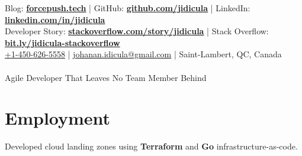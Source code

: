 \documentclass[]{jidicula-resume}
\begin{document}
\livelocation\hfill\lastupdated{}

{ Blog: \href{http://bit.ly/jidicula-site}{\bf forcepush.tech}
  | GitHub: \href{http://bit.ly/jidicula_github}{\bf github.com/jidicula} | LinkedIn: \href{https://bit.ly/jidicula-linkedin}{\bf linkedin.com/in/jidicula} \\
  Developer Story: \href{https://stackoverflow.com/story/jidicula}{\bf stackoverflow.com/story/jidicula} | Stack Overflow: \href{https://bit.ly/jidicula-stackoverflow}{\bf bit.ly/jidicula-stackoverflow} \\
  \href{tel:14506265558}{+1-450-626-5558}
  | \href{mailto:johanan.idicula+resume@gmail.com}{johanan.idicula@gmail.com}
  | Saint-Lambert, QC, Canada \\~\\
{\Large Agile Developer That Leaves No Team Member Behind}
}

\section{Employment}


\vspace{\topsep} %
\begin{tightemize}
\item Developed cloud landing zones using \textbf{Terraform} and \textbf{Go} infrastructure-as-code.
\end{tightemize}
\sectionsep{}
\end{document}
